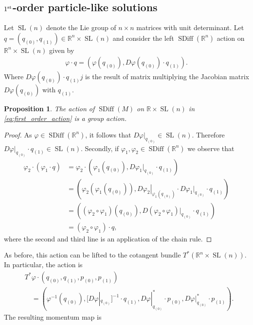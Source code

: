 \documentclass[12pt]{amsart}
\newcommand{\R}{\ensuremath{\mathbb{R}}}
\newtheorem{prop}[thm]{Proposition}
\DeclareMathOperator{\SDiff}{SDiff}
\DeclareMathOperator{\SL}{SL}
\begin{document}
\subsection{$1^{\rm st}$-order particle-like solutions}
\label{sec:first_order}
  Let $\SL(n)$ denote the Lie group of $n\times n$ matrices
  with unit determinant.
  Let $q = (q_{(0)}, q_{(1)}) \in \R^n \times \SL(n)$ and consider the left
  $\SDiff(\R^n)$ action on $\R^n \times \SL(n)$ given by
  \begin{align}
    \varphi \cdot q = (\varphi(q_{(0)} ) , D\varphi(q_{(0)} ) \cdot q_{(1)} ). \label{eq:first_order_action}
  \end{align}
  Where $D\varphi(q_{(0)} ) \cdot q_{(1)}j$ is the result of matrix multiplying
  the Jacobian matrix $D\varphi(q_{(0)} )$ with $q_{(1)}$.
  \begin{prop}
    The action of $\SDiff(M)$ on $\R \times \SL(n)$ in \eqref{eq:first_order_action} is a group action.
  \end{prop}
  \begin{proof}
    As $\varphi \in \SDiff(\R^n)$, it follows that $D\varphi |_{q_{(0)}} \in \SL(n)$.    Therefore $D\varphi |_{q_{(0)}} \cdot q_{(1)} \in \SL(n)$.
    Secondly, if $\varphi_1,\varphi_2 \in \SDiff(\R^n)$ we observe that
    \begin{align*}
      \varphi_2 \cdot (\varphi_1 \cdot q) &= \varphi_2 \cdot (\varphi_1(q_{(0)} ) , D\varphi_1 |_{q_{(0)}} \cdot q_{(1)} ) \\
      &= (\varphi_2(\varphi_1(q_{(0)} )) , \left. D\varphi_2 \right|_{\varphi_1( q_{(0)} )} \cdot D\varphi_1 |_{ q_{(0)} } \cdot q_{(1)} ) \\
      &= ( (\varphi_2 \circ \varphi_1)(q_{(0)} ) , D( \varphi_2 \circ \varphi_1)|_{q_{(0)} } \cdot q_{(1)} ) \\
      &= (\varphi_2 \circ \varphi_1) \cdot q,
    \end{align*}
    where the second and third line is an application of the chain rule.
  \end{proof}
  As before, this action can be lifted to the cotangent bundle $T^*(\R^n \times \SL(n))$.  In particular, 
  the action is
  \begin{align*}
    &T^*\varphi \cdot ( q_{(0)} , q_{(1)}  , p_{(0)} , p_{(1)} ) \\
    &\quad = ( \varphi^{-1}(q_{(0)})  , [D\varphi|_{q_{(0)}}]^{-1} \cdot q_{(1)} , D\varphi|_{q_{(0)}}^* \cdot p_{(0)} , D\varphi|_{q_{(0)}}^* \cdot p_{(1)} ).
  \end{align*}
  The resulting momentum map is
\end{document}
